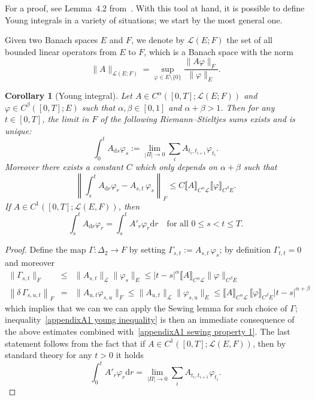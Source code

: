 \documentclass[10pt]{article}
\newcommand{\assign}{:=}
\newcommand{\mathd}{\mathrm{d}}
\newtheorem{corollary}[theorem]{Corollary}
\begin{document}
For a proof, see Lemma~4.2 from~{\cite{frizhairer}}. With this tool at hand,
it is possible to define Young integrals in a variety of situations; we start
by the most general one.

Given two Banach spaces $E$ and $F$, we denote by $\mathcal{L} (E ; F)$ the
set of all bounded linear operators from $E$ to $F$, which is a Banach space
with the norm
\[ \| A \|_{\mathcal{L} (E ; F)} = \sup_{\varphi \in E \setminus \{ 0 \}}
   \frac{\| A \varphi \|_F}{\| \varphi \|_E} . \]


\begin{corollary}[Young integral]
  \label{appendixA1 corollary young}Let $A \in C^{\alpha} ([0, T] ;
  \mathcal{L} (E ; F))$ and $\varphi \in C^{\beta} ([0, T] ; E)$ such that
  $\alpha, \beta \in [0, 1]$ and $\alpha + \beta > 1$. Then for any $t \in [0,
  T]$, the limit in $F$ of the following Riemann--Stieltjes sums exists
  and is unique:
  \[ \int_0^t A_{\mathd s} \varphi_s \assign \lim_{| \Pi | \rightarrow 0}
     \sum_i A_{t_i, t_{i + 1}} \varphi_{t_i} . \]
  Moreover there exists a constant $C$ which only depends on $\alpha + \beta$
  such that
  \begin{equation}
    \left\| \int_s^t A_{\mathd r} \varphi_r - A_{s, t} \, \varphi_s \right\|_F
    \leqslant C \llbracket A \rrbracket_{C^{\alpha} \mathcal{L}}  \llbracket
    \varphi \rrbracket_{C^{\beta} E} . \label{appendixA1 young inequality}
  \end{equation}
  If $A \in C^1 ([0, T] ; \mathcal{L} (E, F))$, then
  \[ \int_s^t A_{\mathd r} \varphi_r = \int_s^t A'_r \varphi_r \mathd r \quad
     \text{for all } 0 \leqslant s < t \leqslant T. \]
\end{corollary}

\begin{proof}
  Define the map $\Gamma : \Delta_2 \rightarrow F$ by setting $\Gamma_{s, t}
  \assign A_{s, t} \, \varphi_s$; by definition $\Gamma_{t, t} = 0$ and
  moreover
  \begin{eqnarray*}
    \| \Gamma_{s, t} \|_F & \leqslant & \| A_{s, t} \|_{\mathcal{L}} \|
    \varphi_s \|_E \leqslant | t - s |^{\alpha} \llbracket A
    \rrbracket_{C^{\alpha} \mathcal{L}}  \| \varphi \|_{C^{\beta} E}\\
    \left\| \delta \, \Gamma_{s, u, t} \right\|_F & = & \| A_{u, t}
    \varphi_{s, u} \|_F \leqslant \| A_{u, t} \|_{\mathcal{L}} \| \varphi_{s,
    u} \|_E \leqslant \llbracket A \rrbracket_{C^{\alpha} \mathcal{L}} \,
    \llbracket \varphi \rrbracket_{C^{\beta} E} | t - s |^{\alpha + \beta}
  \end{eqnarray*}
  which implies that we can we can apply the Sewing lemma for such choice of
  $\Gamma$; inequality~\eqref{appendixA1 young inequality} is then an
  immediate consequence of the above estimates combined with~\eqref{appendixA1
  sewing property 1}. The last statement follows from the fact that if $A \in
  C^1 ([0, T] ; \mathcal{L} (E, F))$, then by standard theory for any $t > 0$
  it holds
  \[ \int_0^t A'_r \varphi_r \mathd r = \lim_{| \Pi | \rightarrow 0} \sum_i
     A_{t_i, t_{i + 1}} \varphi_{t_i} . \]
\end{proof}
\end{document}
